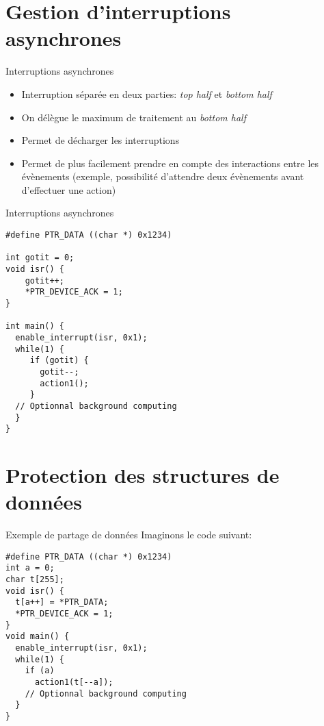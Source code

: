 \section{Gestion d'interruptions asynchrones}

\begin{frame}[fragile]{Interruptions asynchrones}
  \begin{itemize}
  \item  Interruption  séparée en  deux  parties:  \emph{top half}  et
    \emph{bottom half}
  \item On délègue le maximum de traitement au \emph{bottom half}
  \item Permet de décharger les interruptions
  \item Permet  de plus facilement prendre en  compte des interactions
    entre  les   évènements  (exemple,  possibilité   d'attendre  deux
    évènements avant d'effectuer une action)
  \end{itemize}
\end{frame}

\begin{frame}[fragile]{Interruptions asynchrones}
  \begin{lstlisting}
#define PTR_DATA ((char *) 0x1234)

int gotit = 0;
void isr() {
    gotit++;
    *PTR_DEVICE_ACK = 1;
}

int main() {
  enable_interrupt(isr, 0x1);
  while(1) {
     if (gotit) {
       gotit--;
       action1();
     }
  // Optionnal background computing
  }
}
  \end{lstlisting}
\end{frame}

\section{Protection des structures de données}

\begin{frame}[fragile]{Exemple de partage de données}
  Imaginons le code suivant:
  \begin{lstlisting}
#define PTR_DATA ((char *) 0x1234)
int a = 0;
char t[255];
void isr() {
  t[a++] = *PTR_DATA;
  *PTR_DEVICE_ACK = 1;
}
void main() {
  enable_interrupt(isr, 0x1);
  while(1) {
    if (a)
      action1(t[--a]);
    // Optionnal background computing
  }
}
  \end{lstlisting}
\end{frame}

